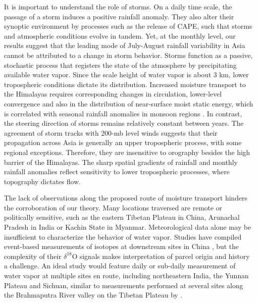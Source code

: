 	It is important to understand the role of storms. On a daily time scale, the passage of a storm induces a positive rainfall anomaly. They also alter their synoptic environment by processes such as the release of CAPE, such that storms and atmospheric conditions evolve in tandem. Yet, at the monthly level, our results suggest that the leading mode of July-August rainfall variability in Asia cannot be attributed to a change in storm behavior. Storms function as a passive, stochastic process that registers the state of the atmosphere by precipitating available water vapor. Since the scale height of water vapor is about 3 km, lower tropospheric conditions dictate its distribution. Increased moisture transport to the Himalayas requires corresponding changes in circulation, lower-level convergence and also in the distribution of near-surface moist static energy, which is correlated with seasonal rainfall anomalies in monsoon regions \citep{Hurley2013}. In contrast, the steering direction of storms remains relatively constant between years. The agreement of storm tracks with 200-mb level winds suggests that their propagation across Asia is generally an upper tropospheric process, with some regional exceptions. Therefore, they are insensitive to orography besides the high barrier of the Himalayas. The sharp spatial gradients of rainfall and monthly rainfall anomalies reflect sensitivity to lower tropospheric processes, where topography dictates flow. 
		
	The lack of observations along the proposed route of moisture transport hinders the corroboration of our theory. Many locations traversed are remote or politically sensitive, such as the eastern Tibetan Plateau in China, Arunachal Pradesh in India or Kachin State in Myanmar. Meteorological data alone may be insufficient to characterize the behavior of water vapor. Studies have compiled event-based measurements of isotopes at downstream sites in China \citep{Yang2011a,Wu2014}, but the complexity of their $\delta ^{18}$O signals makes interpretation of parcel origin and history a challenge. An ideal study would feature daily or sub-daily measurement of water vapor at multiple sites en route, including northeastern India, the Yunnan Plateau and Sichuan, similar to measurements performed at several sites along the Brahmaputra River valley on the Tibetan Plateau by \cite{Gao2011}.
	
